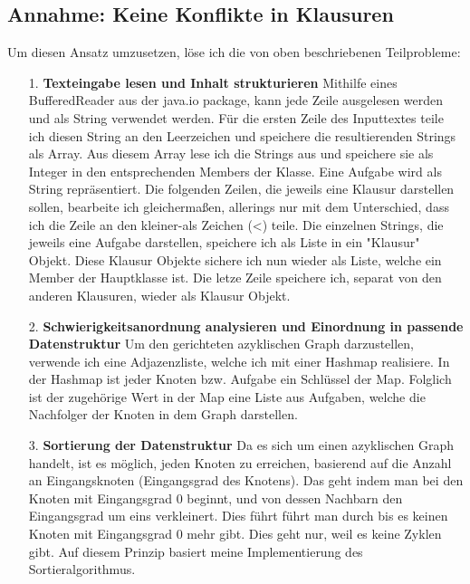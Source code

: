 \documentclass[a4paper,10pt,ngerman]{scrartcl}
\begin{document}
\subsection{Annahme: Keine Konflikte in Klausuren}
Um diesen Ansatz umzusetzen, löse ich die von oben beschriebenen Teilprobleme:
\begin{itemize}
  \item[1.] \textbf{Texteingabe lesen und Inhalt strukturieren}
  \newline
  Mithilfe eines BufferedReader aus der java.io package, kann jede Zeile ausgelesen werden und als String verwendet werden. Für die ersten Zeile des Inputtextes
  teile ich diesen String an den Leerzeichen und speichere die resultierenden Strings als Array. Aus diesem Array lese ich die Strings aus und speichere sie als Integer in
  den entsprechenden Members der Klasse. Eine Aufgabe wird als String repräsentiert.
  \newline
  Die folgenden Zeilen, die jeweils eine Klausur darstellen sollen, bearbeite ich gleichermaßen, allerings nur mit dem Unterschied, dass ich die Zeile an den kleiner-als Zeichen (<) teile.
  Die einzelnen Strings, die jeweils eine Aufgabe darstellen, speichere ich als Liste in ein "Klausur" Objekt. Diese Klausur Objekte sichere ich nun wieder als Liste, welche ein Member der Hauptklasse ist.
  \newline
  Die letze Zeile speichere ich, separat von den anderen Klausuren, wieder als Klausur Objekt.
  \item[2.] \textbf{Schwierigkeitsanordnung analysieren und Einordnung in passende Datenstruktur}
  \newline
  Um den gerichteten azyklischen Graph darzustellen, verwende ich eine Adjazenzliste, welche ich mit einer Hashmap realisiere. In der Hashmap ist jeder Knoten bzw. Aufgabe ein Schlüssel der Map.
  Folglich ist der zugehörige Wert in der Map eine Liste aus Aufgaben, welche die Nachfolger der Knoten in dem Graph darstellen.
  \item[3.] \textbf{Sortierung der Datenstruktur}
  \newline
  Da es sich um einen azyklischen Graph handelt, ist es möglich, jeden Knoten zu erreichen, basierend auf die Anzahl an Eingangsknoten (Eingangsgrad des Knotens). Das geht indem man bei den Knoten mit
  Eingangsgrad 0 beginnt, und von dessen Nachbarn den Eingangsgrad um eins verkleinert. Dies führt führt man durch bis es keinen Knoten mit Eingangsgrad 0 mehr gibt. Dies geht nur, weil es keine Zyklen gibt.
  Auf diesem Prinzip basiert meine Implementierung des Sortieralgorithmus.

\end{itemize}
\end{document}
